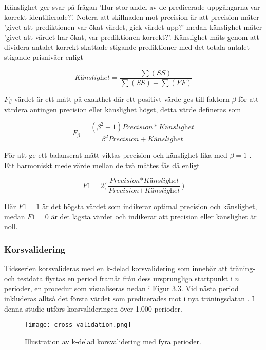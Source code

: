 \documentclass[11pt]{article}
\numberwithin{equation}{section}
\numberwithin{table}{section}
\numberwithin{figure}{section}
\begin{document}
Känslighet ger svar på frågan 'Hur stor andel av de predicerade uppgångarna var korrekt identifierade?'. Notera att skillnaden mot precision är att precision mäter 'givet att prediktionen var ökat värdet, gick värdet upp?' medan känslighet mäter 'givet att värdet har ökat, var prediktionen korrekt?'. Känslighet mäts genom att dividera antalet korrekt skattade stigande prediktioner med det totala antalet stigande prisnivåer enligt

\begin{equation}
    \textit{Känslighet} = \frac{\sum(SS)}{\sum(SS)+\sum(FF)}
\end{equation}

$F_{\beta}$-värdet är ett mått på exakthet där ett positivt värde ges till faktorn $\beta$ för att värdera antingen precision eller känslighet högst, detta värde defineras som

\begin{equation}
    F_{\beta} = \frac{(\beta^2+1) \textit{Precision} * 
    \textit{Känslighet}}{\beta^2  \textit{Precision} + \textit{Känslighet}}
\end{equation}

För att ge ett balanserat mått viktas precision och känslighet lika med $\beta=1$ \parencite{ModelValidation}. Ett harmoniskt medelvärde mellan de två måttes fås då enligt

\begin{equation}
    \textit{F1} = 2 \Big( \frac{\textit{Precision} * \textit{Känslighet}}{\textit{Precision} + \textit{Känslighet}} \Big)
\end{equation}

Där $F1=1$ är det högsta värdet som indikerar optimal precision och känslighet, medan $F1=0$ är det lägsta värdet och indikerar att precision eller känslighet är noll.


\subsubsection{Korsvalidering}
Tidsserien korsvalideras med en k-delad korsvalidering som innebär att träning- och testdata flyttas en period framåt från dess ursprungliga startpunkt i $n$ perioder, en procedur som visualiseras nedan i Figur 3.3. Vid nästa period inkluderas alltså det första värdet som predicerades mot i nya träningsdatan \parencite{bergmeir2018note}. I denna studie utförs korsvalideringen över 1.000 perioder. 

\begin{figure}[H]
\caption{Illustration av k-delad korsvalidering med fyra perioder.}
\texttt{[image: cross\_validation.png]}
\centering
\end{figure}
\end{document}
